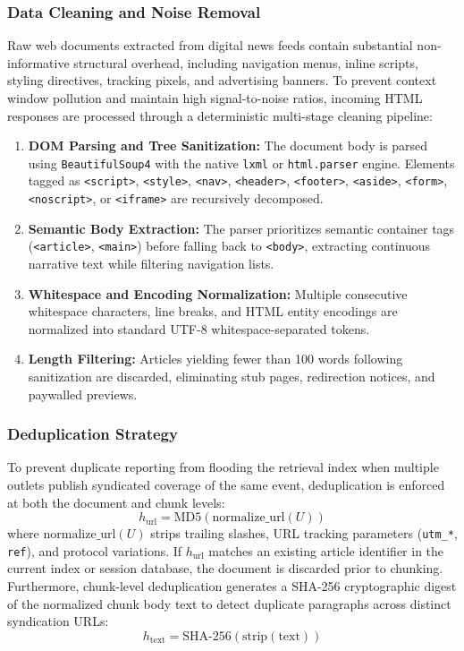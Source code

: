 \subsubsection{Data Cleaning and Noise Removal}
Raw web documents extracted from digital news feeds contain substantial non-informative structural overhead, including navigation menus, inline scripts, styling directives, tracking pixels, and advertising banners. To prevent context window pollution and maintain high signal-to-noise ratios, incoming HTML responses are processed through a deterministic multi-stage cleaning pipeline:
\begin{enumerate}
    \item \textbf{DOM Parsing and Tree Sanitization:} The document body is parsed using \texttt{BeautifulSoup4} with the native \texttt{lxml} or \texttt{html.parser} engine. Elements tagged as \texttt{<script>}, \texttt{<style>}, \texttt{<nav>}, \texttt{<header>}, \texttt{<footer>}, \texttt{<aside>}, \texttt{<form>}, \texttt{<noscript>}, or \texttt{<iframe>} are recursively decomposed.
    \item \textbf{Semantic Body Extraction:} The parser prioritizes semantic container tags (\texttt{<article>}, \texttt{<main>}) before falling back to \texttt{<body>}, extracting continuous narrative text while filtering navigation lists.
    \item \textbf{Whitespace and Encoding Normalization:} Multiple consecutive whitespace characters, line breaks, and HTML entity encodings are normalized into standard UTF-8 whitespace-separated tokens.
    \item \textbf{Length Filtering:} Articles yielding fewer than 100 words following sanitization are discarded, eliminating stub pages, redirection notices, and paywalled previews.
\end{enumerate}

\subsubsection{Deduplication Strategy}
To prevent duplicate reporting from flooding the retrieval index when multiple outlets publish syndicated coverage of the same event, deduplication is enforced at both the document and chunk levels:
\begin{equation}
\label{eq:url_hash}
h_{\text{url}} = \text{MD5}(\text{normalize\_url}(U))
\end{equation}
where $\text{normalize\_url}(U)$ strips trailing slashes, URL tracking parameters (\texttt{utm\_*}, \texttt{ref}), and protocol variations. If $h_{\text{url}}$ matches an existing article identifier in the current index or session database, the document is discarded prior to chunking. Furthermore, chunk-level deduplication generates a SHA-256 cryptographic digest of the normalized chunk body text to detect duplicate paragraphs across distinct syndication URLs:
\begin{equation}
\label{eq:text_hash}
h_{\text{text}} = \text{SHA-256}(\text{strip}(\text{text}))
\end{equation}

